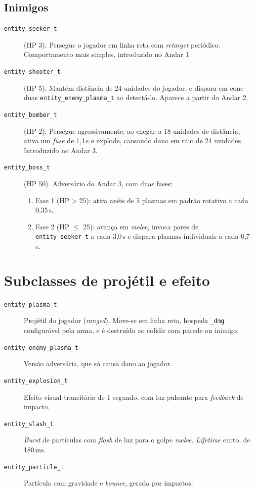 \subsection{Inimigos}

\begin{description}
  \item[\texttt{entity\_seeker\_t}] (HP 3). Persegue o jogador em linha reta com
    \emph{retarget} periódico. Comportamento mais simples, introduzido no Andar 1.
  \item[\texttt{entity\_shooter\_t}] (HP 5). Mantém distância de 24 unidades do
    jogador, e dispara em cone duas \texttt{entity\_enemy\_plasma\_t} ao detectá-lo.
    Aparece a partir do Andar 2.
  \item[\texttt{entity\_bomber\_t}] (HP 2). Persegue agressivamente; ao chegar a 18
    unidades de distância, ativa um \emph{fuse} de 1,1\,s e explode, causando dano em
    raio de 24 unidades. Introduzido no Andar 3.
  \item[\texttt{entity\_boss\_t}] (HP 50). Adversário do Andar 3, com duas fases:
    \begin{enumerate}
      \item Fase 1 (HP > 25): atira anéis de 5 plasmas em padrão rotativo a cada 0,35\,s.
      \item Fase 2 (HP $\leq$ 25): avança em \emph{melee}, invoca pares de
        \texttt{entity\_seeker\_t} a cada 3,0\,s e dispara plasmas individuais a cada
        0,7\,s.
    \end{enumerate}
\end{description}

\section{Subclasses de projétil e efeito}

\begin{description}
  \item[\texttt{entity\_plasma\_t}] Projétil do jogador (\emph{ranged}). Move-se em
    linha reta, hospeda \texttt{\_dmg} configurável pela arma, e é destruído ao colidir
    com parede ou inimigo.
  \item[\texttt{entity\_enemy\_plasma\_t}] Versão adversária, que só causa dano ao
    jogador.
  \item[\texttt{entity\_explosion\_t}] Efeito visual transitório de 1 segundo, com luz
    pulsante para \emph{feedback} de impacto.
  \item[\texttt{entity\_slash\_t}] \emph{Burst} de partículas com \emph{flash} de luz
    para o golpe \emph{melee}. \emph{Lifetime} curto, de 180\,ms.
  \item[\texttt{entity\_particle\_t}] Partícula com gravidade e \emph{bounce}, gerada
    por impactos.
\end{description}


